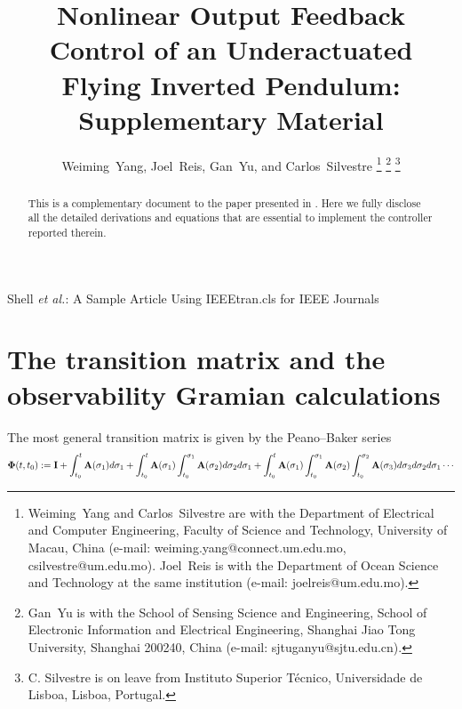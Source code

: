 \documentclass[journal,onecolumn]{IEEEtran}
\begin{document}
\title{Nonlinear Output Feedback Control of an Underactuated  Flying Inverted Pendulum: Supplementary Material}

\author{Weiming~Yang,
		Joel~Reis,
        Gan~Yu, and 
        Carlos~Silvestre
	\thanks{Weiming~Yang and Carlos~Silvestre are with the Department of Electrical and Computer Engineering, Faculty of Science and Technology, University of Macau, China (e-mail: weiming.yang@connect.um.edu.mo, csilvestre@um.edu.mo).
		Joel~Reis is with the Department of Ocean Science and Technology at the same institution (e-mail: joelreis@um.edu.mo).}
	\thanks{Gan~Yu is with the School of Sensing Science and Engineering, School of Electronic Information and Electrical Engineering, Shanghai Jiao Tong University, Shanghai 200240, China (e-mail: sjtuganyu@sjtu.edu.cn).}
	\thanks{C. Silvestre is on leave from Instituto Superior Técnico, Universidade de Lisboa, Lisboa, Portugal.}
}

%
{Shell \MakeLowercase{\textit{et al.}}: A Sample Article Using IEEEtran.cls for IEEE Journals}

\maketitle

\begin{abstract}
	This is a complementary document to the paper presented in \cite{2024_Yang_TIE}.
	Here we fully disclose all the detailed derivations and equations that are essential to implement the controller reported therein.
\end{abstract}

\section{The transition matrix and the observability Gramian calculations}

The most general transition matrix is given by the Peano–Baker series
	\begin{align}
	\boldsymbol{\Phi}(t,t_0):= {\mathbf I} + \int_{t_0}^t{\mathbf A}(\sigma_1)d\sigma_1 + \int_{t_0}^t{\mathbf A}(\sigma_1)\int_{t_0}^{\sigma_1}{\mathbf A}(\sigma_2)d\sigma_2d\sigma_1 +
	\int_{t_0}^t{\mathbf A}(\sigma_1)\int_{t_0}^{\sigma_1}{\mathbf A}(\sigma_2)\int_{t_0}^{\sigma_2}{\mathbf A}(\sigma_3)d\sigma_3d\sigma_2d\sigma_1
	 \cdots
\end{align}
\end{document}
